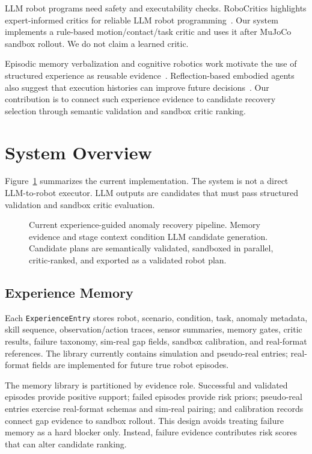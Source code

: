 \documentclass[conference]{IEEEtran}
\begin{document}
LLM robot programs need safety and executability checks. RoboCritics highlights expert-informed critics for reliable LLM robot programming~\cite{kim2026robocritics}. Our system implements a rule-based motion/contact/task critic and uses it after MuJoCo sandbox rollout. We do not claim a learned critic.

Episodic memory verbalization and cognitive robotics work motivate the use of structured experience as reusable evidence~\cite{episodic2025verbalization,gwt2024episodic}. Reflection-based embodied agents also suggest that execution histories can improve future decisions~\cite{wang2025evolvable}. Our contribution is to connect such experience evidence to candidate recovery selection through semantic validation and sandbox critic ranking.

\section{System Overview}
Figure~\ref{fig:pipeline} summarizes the current implementation. The system is not a direct LLM-to-robot executor. LLM outputs are candidates that must pass structured validation and sandbox critic evaluation.

\begin{figure}[t]
    \centering
    \caption{Current experience-guided anomaly recovery pipeline. Memory evidence and stage context condition LLM candidate generation. Candidate plans are semantically validated, sandboxed in parallel, critic-ranked, and exported as a validated robot plan.}
    \label{fig:pipeline}
\end{figure}

\subsection{Experience Memory}
Each \texttt{ExperienceEntry} stores robot, scenario, condition, task, anomaly metadata, skill sequence, observation/action traces, sensor summaries, memory gates, critic results, failure taxonomy, sim-real gap fields, sandbox calibration, and real-format references. The library currently contains simulation and pseudo-real entries; real-format fields are implemented for future true robot episodes.

The memory library is partitioned by evidence role. Successful and validated episodes provide positive support; failed episodes provide risk priors; pseudo-real entries exercise real-format schemas and sim-real pairing; and calibration records connect gap evidence to sandbox rollout. This design avoids treating failure memory as a hard blocker only. Instead, failure evidence contributes risk scores that can alter candidate ranking.
\end{document}
